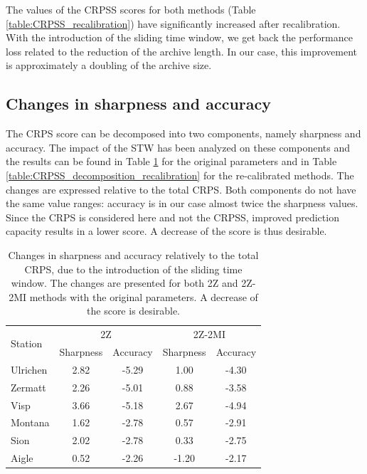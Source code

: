 \documentclass[hess]{copernicus}
\begin{document}
The values of the CRPSS scores for both methods (Table \ref{table:CRPSS_recalibration}) have significantly increased after recalibration. With the introduction of the sliding time window, we get back the performance loss related to the reduction of the archive length. In our case, this improvement is approximately a doubling of the archive size.


\subsection{Changes in sharpness and accuracy}

The CRPS score can be decomposed into two components, namely sharpness and accuracy. The impact of the STW has been analyzed on these components and the results can be found in Table \ref{table:CRPSS_decomposition_no_recalibration} for the original parameters and in Table \ref{table:CRPSS_decomposition_recalibration} for the re-calibrated methods. The changes are expressed relative to the total CRPS. Both components do not have the same value ranges: accuracy is in our case almost twice the sharpness values. Since the CRPS is considered here and not the CRPSS, improved prediction capacity results in a lower score. A decrease of the score is thus desirable.

\begin{table}[htb]
	\caption{Changes in sharpness and accuracy relatively to the total CRPS, due to the introduction of the sliding time window. The changes are presented for both 2Z and 2Z-2MI methods with the original parameters. A decrease of the score is desirable.}
	\begin{center}
		\begin{tabular}{l c c c c}
			\hline
			\multirow{2}{*}{Station} & \multicolumn{2}{c}{2Z} & \multicolumn{2}{c}{2Z-2MI} \\
			& Sharpness & Accuracy & Sharpness & Accuracy \\
			\hline
			Ulrichen & 2.82 & -5.29 & 1.00 & -4.30 \\
			Zermatt & 2.26 & -5.01 & 0.88 & -3.58 \\
			Visp & 3.66 & -5.18 & 2.67 & -4.94 \\
			Montana & 1.62 & -2.78 & 0.57 & -2.91 \\
			Sion & 2.02 & -2.78 & 0.33 & -2.75 \\
			Aigle & 0.52 & -2.26 & -1.20 & -2.17 \\ 
			\hline
		\end{tabular}
	\end{center}
	\label{table:CRPSS_decomposition_no_recalibration}
\end{table}
\end{document}
